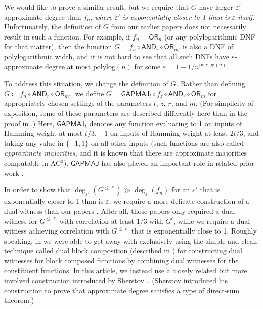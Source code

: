 \documentclass{toc}
\newcommand{\polylog}{\mathrm{polylog}}
\newcommand{\OR}{\mathsf{ OR}}
\newcommand{\GAPMAJ}{\mathsf{GAPMAJ}}
\newcommand{\eps}{\varepsilon}
\newcommand{\adeg}{\widetilde{\operatorname{deg}}}
\newcommand{\AND}{\mathsf{AND}}
\begin{document}
We would like to prove a similar result, but we require that $G$ have larger $\eps'$-approximate degree than $f_n$, \emph{where $\eps'$ is exponentially closer to 1
	than is $\eps$ itself}. 
Unfortunately, the definition of $G$ from our
%
earlier papers  %
\cite{adegsurj, bkt} does not necessarily result in such a function. For example, if $f_n = \OR_n$
(or any polylogarithmic DNF for that matter), then the function $G=f_n \circ \AND_r \circ \OR_{m'}$ is also a DNF of polylogarithmic width, and 
it is not hard to see that all such DNFs have $\eps$-approximate degree at most $\polylog(n)$ for some $\eps=1-1/n^{\polylog(n)}$. 

To address this situation, we change the definition of $G$. Rather than defining  $G\coloneqq f_n \circ \AND_r \circ \OR_{m'}$, we
define $G=\GAPMAJ_t  \circ f_z \circ \AND_r \circ \OR_{m}$ for appropriately chosen settings of the parameters $t$, $z$, $r$, and $m$. (For simplicity of exposition, some of these parameters are described differently here than in the proof in .)
Here, $\GAPMAJ_t$ denotes any function evaluating to 1 on inputs of Hamming weight at most $t/3$, $-1$ on inputs of Hamming weight
at least $2t/3$, and taking any value in $\{-1, 1\}$ on all other inputs (such functions are also called \emph{approximate majorities}, and 
it is known that there are approximate majorities computable in AC$^0$). $\GAPMAJ$ has also played an important role
in related prior work \cite{bchtv, adegsurj}.

In order to show that $\adeg_{\eps'}(G^{\leq \ell}) \gg \adeg_{\eps}(f_n)$ for an $\eps'$ that is exponentially closer to 1 than is $\eps$,
we require a more delicate construction of a dual witness than our
%
%
papers \cite{adegsurj, bkt}.  %
After all, %
those papers   %
 only required a dual witness for $G^{\leq \ell}$ with correlation at least $1/3$ with $G^{\ell}$, while we require
a dual witness achieving correlation with $G^{\leq \ell}$ that is exponentially close to 1. 
Roughly speaking, %
in \cite{adegsurj, bkt} we %
%
were able to get away
with exclusively using the simple and clean technique called dual block composition (described in ) for constructing
dual witnesses for block composed functions by combining dual witnesses for the constituent functions. %
In this %
article,  %
we instead use a closely related but more involved
construction introduced by Sherstov~\cite{sherstovdp}. (Sherstov introduced his construction to prove that approximate degree satisfies a type of direct-sum theorem.)
\end{document}
